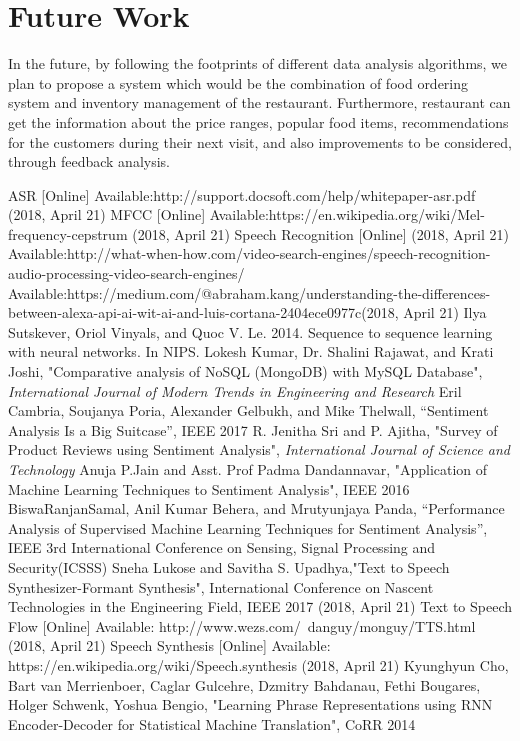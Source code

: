 \documentclass[conference]{IEEEtran}
\begin{document}
	\section{Future Work}
	
	In the future, by following the footprints of different data analysis algorithms, we plan to propose a system which would be the combination of food ordering system and inventory management of the restaurant. 
	Furthermore, restaurant can get the information about the price ranges, popular food items, recommendations for the customers during their next visit, and also improvements to be considered, through feedback analysis.
	
	
	\begin{thebibliography}{00}
		ASR [Online] Available:http://support.docsoft.com/help/whitepaper-asr.pdf (2018, April 21)  
		 MFCC [Online] Available:https://en.wikipedia.org/wiki/Mel-frequency-cepstrum (2018, April 21) 
		 Speech Recognition [Online] (2018, April 21) Available:http://what-when-how.com/video-search-engines/speech-recognition-audio-processing-video-search-engines/
		 Available:https://medium.com/@abraham.kang/understanding-the-differences-between-alexa-api-ai-wit-ai-and-luis-cortana-2404ece0977c(2018, April 21)
		 Ilya Sutskever, Oriol Vinyals, and Quoc V. Le. 2014.
		Sequence to sequence learning with neural networks. In
		NIPS.
		 Lokesh Kumar, Dr. Shalini Rajawat, and Krati Joshi, "Comparative analysis of NoSQL (MongoDB) with MySQL Database", \textit{International Journal of Modern Trends in Engineering and Research}
		Eril Cambria, Soujanya Poria, Alexander Gelbukh, and Mike Thelwall, “Sentiment Analysis Is a Big Suitcase”, IEEE 2017
		 R. Jenitha Sri and P. Ajitha, "Survey of Product Reviews using Sentiment Analysis", \textit{International Journal of Science and Technology}
		 Anuja P.Jain and Asst. Prof Padma Dandannavar, "Application of Machine Learning Techniques to Sentiment Analysis", IEEE 2016
		BiswaRanjanSamal, Anil Kumar Behera, and Mrutyunjaya Panda, “Performance Analysis of Supervised Machine Learning Techniques for Sentiment Analysis”, IEEE 3rd International Conference on Sensing, Signal Processing and Security(ICSSS)
		  Sneha Lukose and Savitha S. Upadhya,"Text to Speech Synthesizer-Formant Synthesis", International Conference on Nascent Technologies in the Engineering Field, IEEE 2017 (2018, April 21) 
		Text to Speech Flow [Online] Available: http://www.wezs.com/~danguy/monguy/TTS.html (2018, April 21) 
		Speech Synthesis [Online] Available: https://en.wikipedia.org/wiki/Speech.synthesis (2018, April 21) 
		Kyunghyun Cho, Bart van Merrienboer, Caglar Gulcehre, Dzmitry Bahdanau, Fethi Bougares, Holger Schwenk, Yoshua Bengio,
		"Learning Phrase Representations using {RNN} Encoder-Decoder for Statistical
		Machine Translation", CoRR 2014
		
		
	\end{thebibliography}
\end{document}
